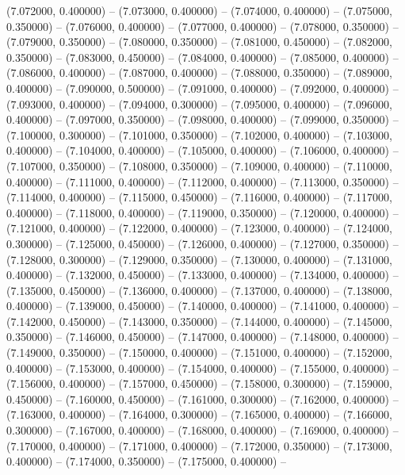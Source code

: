 (7.072000, 0.400000) -- 
(7.073000, 0.400000) -- 
(7.074000, 0.400000) -- 
(7.075000, 0.350000) -- 
(7.076000, 0.400000) -- 
(7.077000, 0.400000) -- 
(7.078000, 0.350000) -- 
(7.079000, 0.350000) -- 
(7.080000, 0.350000) -- 
(7.081000, 0.450000) -- 
(7.082000, 0.350000) -- 
(7.083000, 0.450000) -- 
(7.084000, 0.400000) -- 
(7.085000, 0.400000) -- 
(7.086000, 0.400000) -- 
(7.087000, 0.400000) -- 
(7.088000, 0.350000) -- 
(7.089000, 0.400000) -- 
(7.090000, 0.500000) -- 
(7.091000, 0.400000) -- 
(7.092000, 0.400000) -- 
(7.093000, 0.400000) -- 
(7.094000, 0.300000) -- 
(7.095000, 0.400000) -- 
(7.096000, 0.400000) -- 
(7.097000, 0.350000) -- 
(7.098000, 0.400000) -- 
(7.099000, 0.350000) -- 
(7.100000, 0.300000) -- 
(7.101000, 0.350000) -- 
(7.102000, 0.400000) -- 
(7.103000, 0.400000) -- 
(7.104000, 0.400000) -- 
(7.105000, 0.400000) -- 
(7.106000, 0.400000) -- 
(7.107000, 0.350000) -- 
(7.108000, 0.350000) -- 
(7.109000, 0.400000) -- 
(7.110000, 0.400000) -- 
(7.111000, 0.400000) -- 
(7.112000, 0.400000) -- 
(7.113000, 0.350000) -- 
(7.114000, 0.400000) -- 
(7.115000, 0.450000) -- 
(7.116000, 0.400000) -- 
(7.117000, 0.400000) -- 
(7.118000, 0.400000) -- 
(7.119000, 0.350000) -- 
(7.120000, 0.400000) -- 
(7.121000, 0.400000) -- 
(7.122000, 0.400000) -- 
(7.123000, 0.400000) -- 
(7.124000, 0.300000) -- 
(7.125000, 0.450000) -- 
(7.126000, 0.400000) -- 
(7.127000, 0.350000) -- 
(7.128000, 0.300000) -- 
(7.129000, 0.350000) -- 
(7.130000, 0.400000) -- 
(7.131000, 0.400000) -- 
(7.132000, 0.450000) -- 
(7.133000, 0.400000) -- 
(7.134000, 0.400000) -- 
(7.135000, 0.450000) -- 
(7.136000, 0.400000) -- 
(7.137000, 0.400000) -- 
(7.138000, 0.400000) -- 
(7.139000, 0.450000) -- 
(7.140000, 0.400000) -- 
(7.141000, 0.400000) -- 
(7.142000, 0.450000) -- 
(7.143000, 0.350000) -- 
(7.144000, 0.400000) -- 
(7.145000, 0.350000) -- 
(7.146000, 0.450000) -- 
(7.147000, 0.400000) -- 
(7.148000, 0.400000) -- 
(7.149000, 0.350000) -- 
(7.150000, 0.400000) -- 
(7.151000, 0.400000) -- 
(7.152000, 0.400000) -- 
(7.153000, 0.400000) -- 
(7.154000, 0.400000) -- 
(7.155000, 0.400000) -- 
(7.156000, 0.400000) -- 
(7.157000, 0.450000) -- 
(7.158000, 0.300000) -- 
(7.159000, 0.450000) -- 
(7.160000, 0.450000) -- 
(7.161000, 0.300000) -- 
(7.162000, 0.400000) -- 
(7.163000, 0.400000) -- 
(7.164000, 0.300000) -- 
(7.165000, 0.400000) -- 
(7.166000, 0.300000) -- 
(7.167000, 0.400000) -- 
(7.168000, 0.400000) -- 
(7.169000, 0.400000) -- 
(7.170000, 0.400000) -- 
(7.171000, 0.400000) -- 
(7.172000, 0.350000) -- 
(7.173000, 0.400000) -- 
(7.174000, 0.350000) -- 
(7.175000, 0.400000) -- 
